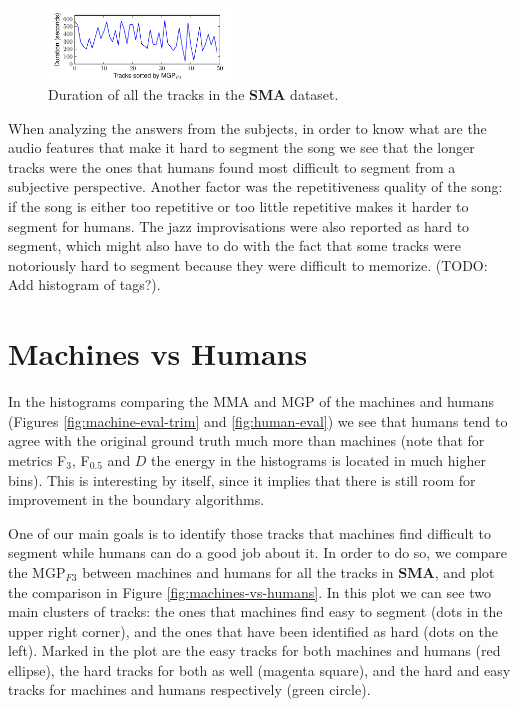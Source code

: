 \documentclass{article}
\begin{document}
\begin{figure}
  \centering
  \includegraphics[width=0.45\textwidth, height=0.13\textheight]{plots/humans-duration.pdf}
  \caption{Duration of all the tracks in the \textbf{SMA} dataset.}
  \label{fig:humansdur}
\end{figure}%

When analyzing the answers from the subjects, in order to know what are the audio features that make it hard to segment the song we see that the longer tracks were the ones that humans found most difficult to segment from a subjective perspective.
Another factor was the repetitiveness quality of the song: if the song is either too repetitive or too little repetitive makes it harder to segment for humans.
The jazz improvisations were also reported as hard to segment, which might also have to do with the fact that some tracks were notoriously hard to segment because they were difficult to memorize.
(TODO: Add histogram of tags?).

\section{Machines vs Humans}\label{section:m-vs-h}

In the histograms comparing the MMA and MGP of the machines and humans (Figures \ref{fig:machine-eval-trim} and \ref{fig:human-eval}) we see that humans tend to agree with the original ground truth much more than machines (note that for metrics F$_3$, F$_{0.5}$ and $D$ the energy in the histograms is located in much higher bins).
This is interesting by itself, since it implies that there is still room for improvement in the boundary algorithms.

One of our main goals is to identify those tracks that machines find difficult to segment while humans can do a good job about it.
In order to do so, we compare the MGP$_{F3}$ between machines and humans for all the tracks in \textbf{SMA}, and plot the comparison in Figure \ref{fig:machines-vs-humans}.
In this plot we can see two main clusters of tracks: the ones that machines find easy to segment (dots in the upper right corner), and the ones that have been identified as hard (dots on the left).
Marked in the plot are the easy tracks for both machines and humans (red ellipse), the hard tracks for both as well (magenta square), and the hard and easy tracks for machines and humans respectively (green circle).
\end{document}

